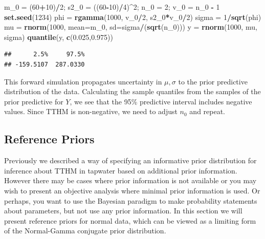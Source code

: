 \documentclass[]{book}
\newenvironment{Shaded}{\begin{snugshade}}{\end{snugshade}}
\newcommand{\KeywordTok}[1]{\textcolor[rgb]{0.13,0.29,0.53}{\textbf{#1}}}
\newcommand{\DataTypeTok}[1]{\textcolor[rgb]{0.13,0.29,0.53}{#1}}
\newcommand{\DecValTok}[1]{\textcolor[rgb]{0.00,0.00,0.81}{#1}}
\newcommand{\FloatTok}[1]{\textcolor[rgb]{0.00,0.00,0.81}{#1}}
\newcommand{\StringTok}[1]{\textcolor[rgb]{0.31,0.60,0.02}{#1}}
\newcommand{\OperatorTok}[1]{\textcolor[rgb]{0.81,0.36,0.00}{\textbf{#1}}}
\newcommand{\NormalTok}[1]{#1}
\theoremstyle{definition}
\theoremstyle{definition}
\theoremstyle{definition}
\theoremstyle{remark}
\begin{document}
\begin{Shaded}
\begin{Highlighting}[]
\NormalTok{m_}\DecValTok{0}\NormalTok{ =}\StringTok{ }\NormalTok{(}\DecValTok{60}\OperatorTok{+}\DecValTok{10}\NormalTok{)}\OperatorTok{/}\DecValTok{2}\NormalTok{; s2_}\DecValTok{0}\NormalTok{ =}\StringTok{ }\NormalTok{((}\DecValTok{60}\OperatorTok{-}\DecValTok{10}\NormalTok{)}\OperatorTok{/}\DecValTok{4}\NormalTok{)}\OperatorTok{^}\DecValTok{2}\NormalTok{;}
\NormalTok{n_}\DecValTok{0}\NormalTok{ =}\StringTok{ }\DecValTok{2}\NormalTok{; v_}\DecValTok{0}\NormalTok{ =}\StringTok{ }\NormalTok{n_}\DecValTok{0} \OperatorTok{-}\StringTok{ }\DecValTok{1}
\KeywordTok{set.seed}\NormalTok{(}\DecValTok{1234}\NormalTok{)}
\NormalTok{phi =}\StringTok{ }\KeywordTok{rgamma}\NormalTok{(}\DecValTok{1000}\NormalTok{, v_}\DecValTok{0}\OperatorTok{/}\DecValTok{2}\NormalTok{, s2_}\DecValTok{0}\OperatorTok{*}\NormalTok{v_}\DecValTok{0}\OperatorTok{/}\DecValTok{2}\NormalTok{)}
\NormalTok{sigma =}\StringTok{ }\DecValTok{1}\OperatorTok{/}\KeywordTok{sqrt}\NormalTok{(phi)}
\NormalTok{mu =}\StringTok{ }\KeywordTok{rnorm}\NormalTok{(}\DecValTok{1000}\NormalTok{, }\DataTypeTok{mean=}\NormalTok{m_}\DecValTok{0}\NormalTok{, }\DataTypeTok{sd=}\NormalTok{sigma}\OperatorTok{/}\NormalTok{(}\KeywordTok{sqrt}\NormalTok{(n_}\DecValTok{0}\NormalTok{)))}
\NormalTok{y =}\StringTok{ }\KeywordTok{rnorm}\NormalTok{(}\DecValTok{1000}\NormalTok{, mu, sigma)}
\KeywordTok{quantile}\NormalTok{(y, }\KeywordTok{c}\NormalTok{(}\FloatTok{0.025}\NormalTok{,}\FloatTok{0.975}\NormalTok{))}
\end{Highlighting}
\end{Shaded}

\begin{verbatim}
##      2.5%     97.5% 
## -159.5107  287.0330
\end{verbatim}

This forward simulation propagates uncertainty in \(\mu,\sigma\) to the
prior predictive distribution of the data. Calculating the sample
quantiles from the samples of the prior predictive for \(Y\), we see
that the 95\% predictive interval includes negative values. Since TTHM
is non-negative, we need to adjust \(n_0\) and repeat.

\subsection{Reference Priors}\label{sec:NG-reference}

Previously we described a way of specifying an informative prior
distribution for inference about TTHM in tapwater based on additional
prior information. However there may be cases where prior information is
not available or you may wish to present an objective analysis where
minimal prior information is used. Or perhaps, you want to use the
Bayesian paradigm to make probability statements about parameters, but
not use any prior information. In this section we will present reference
priors for normal data, which can be viewed as a limiting form of the
Normal-Gamma conjugate prior distribution.
\end{document}
